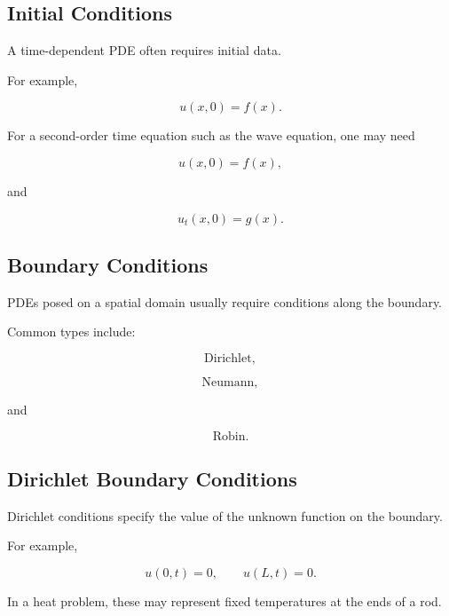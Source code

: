 \subsection{Initial Conditions}
\label{subsec:pde-initial-conditions}

A time-dependent PDE often requires initial data.

For example,

\[
\boxed{
u(x,0)
=
f(x).
}
\]

For a second-order time equation such as the wave equation, one may need

\[
\boxed{
u(x,0)=f(x),
}
\]

and

\[
\boxed{
u_t(x,0)=g(x).
}
\]

\subsection{Boundary Conditions}
\label{subsec:pde-boundary-conditions}

PDEs posed on a spatial domain usually require conditions along the
boundary.

Common types include:

\[
\boxed{
\text{Dirichlet},
}
\]

\[
\boxed{
\text{Neumann},
}
\]

and

\[
\boxed{
\text{Robin}.
}
\]

\subsection{Dirichlet Boundary Conditions}
\label{subsec:dirichlet-boundary-conditions}

Dirichlet conditions specify the value of the unknown function on the
boundary.

For example,

\[
\boxed{
u(0,t)=0,
\qquad
u(L,t)=0.
}
\]

In a heat problem, these may represent fixed temperatures at the ends of
a rod.

